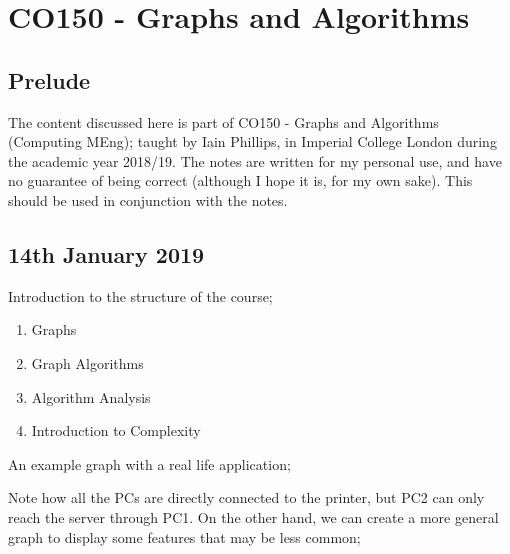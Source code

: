 \documentclass[a4paper, 12pt]{article}
\begin{document}
    \section*{CO150 - Graphs and Algorithms}
        \subsection*{Prelude}
            The content discussed here is part of CO150 - Graphs and Algorithms (Computing MEng); taught by Iain Phillips, in Imperial College London during the academic year 2018/19. The notes are written for my personal use, and have no guarantee of being correct (although I hope it is, for my own sake). This should be used in conjunction with the notes.
        \subsection*{14th January 2019}
            Introduction to the structure of the course;
            \begin{enumerate}[{Part} I:]
                \itemsep0em
                \item Graphs
                \item Graph Algorithms
                \item Algorithm Analysis
                \item Introduction to Complexity
            \end{enumerate}
            An example graph with a real life application;
            \begin{center}
            \end{center}
            Note how all the PCs are directly connected to the printer, but PC2 can only reach the server through PC1. On the other hand, we can create a more general graph to display some features that may be less common;
\end{document}
